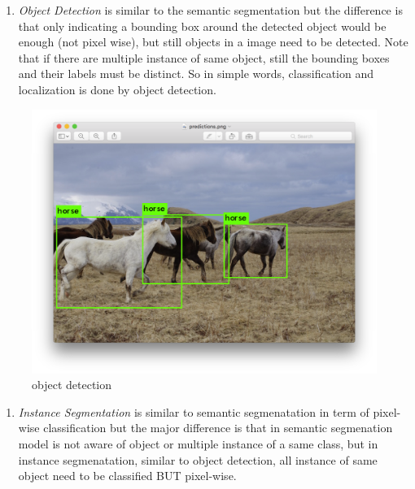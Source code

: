 \documentclass[11pt]{article}
\makeatletter
\def\maxwidth{\ifdim\Gin@nat@width>\linewidth\linewidth
    \else\Gin@nat@width\fi}
\let\Oldincludegraphics\includegraphics
\renewcommand{\includegraphics}[1]{\Oldincludegraphics[width=.8\maxwidth]{#1}}
\providecommand{\tightlist}{%
      \setlength{\itemsep}{0pt}\setlength{\parskip}{0pt}}
\makeatother
\begin{document}
\begin{enumerate}
\def\labelenumi{\arabic{enumi}.}
\setcounter{enumi}{1}
\tightlist
\item
  \emph{Object Detection} is similar to the semantic segmentation but
  the difference is that only indicating a bounding box around the
  detected object would be enough (not pixel wise), but still objects in
  a image need to be detected. Note that if there are multiple instance
  of same object, still the bounding boxes and their labels must be
  distinct. So in simple words, classification and localization is done
  by object detection.
\end{enumerate}

\begin{figure}
\centering
\includegraphics{wiki/objectdetection.png}
\caption{object detection}
\end{figure}

\begin{enumerate}
\def\labelenumi{\arabic{enumi}.}
\setcounter{enumi}{2}
\tightlist
\item
  \emph{Instance Segmentation} is similar to semantic segmenatation in
  term of pixel-wise classification but the major difference is that in
  semantic segmenation model is not aware of object or multiple instance
  of a same class, but in instance segmenatation, similar to object
  detection, all instance of same object need to be classified BUT
  pixel-wise.
\end{enumerate}
\end{document}
